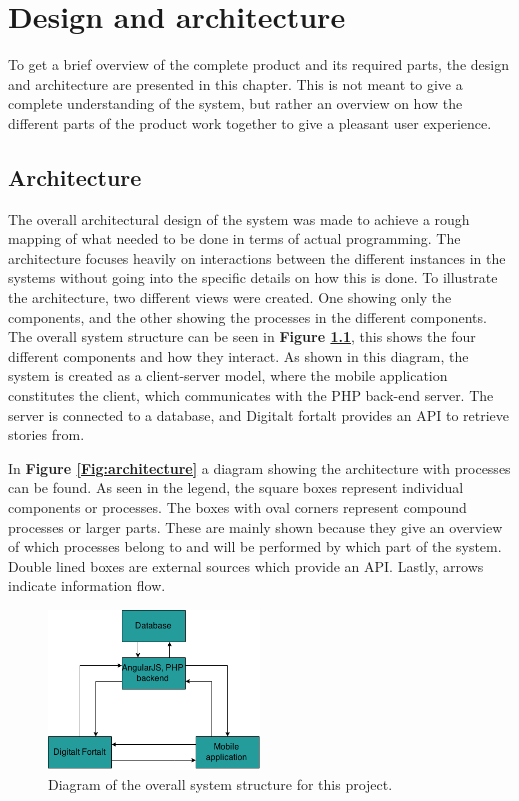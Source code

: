 
\chapter{Design and architecture}

To get a brief overview of the complete product and its required parts, the design and architecture are presented in this chapter. This is not meant to give a complete understanding of the system, but rather an overview on how the different parts of the product work together to give a pleasant user experience.

\section{Architecture}

The overall architectural design of the system was made to achieve a rough mapping of what needed to be done in terms of actual programming. The architecture focuses heavily on interactions between the different instances in the systems without going into the specific details on how this is done. To illustrate the architecture, two different views were created. One showing only the components, and the other showing the processes in the different components. The overall system structure can be seen in \textbf{Figure \ref{Fig:system_structure}}, this shows the four different components and how they interact. As shown in this diagram, the system is created as a client-server model, where the mobile application constitutes the client, which communicates with the PHP back-end server. The server is connected to a database, and Digitalt fortalt provides an API to retrieve stories from.\newline

In \textbf{Figure \ref{Fig:architecture}} a diagram showing the architecture with processes can be found. As seen in the legend, the square boxes represent individual components or processes. The boxes with oval corners represent compound processes or larger parts. These are mainly shown because they give an overview of which processes belong to and will be performed by which part of the system. Double lined boxes are external sources which provide an API. Lastly, arrows indicate information flow.

\begin{figure}[h!]
	\centering
	\includegraphics[width=0.5\textwidth]{fig/system_structure}
	\caption{Diagram of the overall system structure for this project.}
	\label{Fig:system_structure}
\end{figure}

